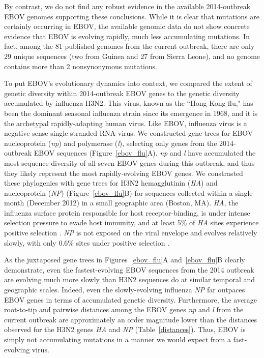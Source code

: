 \documentclass[11pt]{article}
\begin{document}
By contrast, we do not find any robust evidence in the available 2014-outbreak EBOV genomes supporting these conclusions. While it is clear that mutations are certainly occurring in EBOV, the available genomic data do not show concrete evidence that EBOV is evolving rapidly, much less accumulating mutations. In fact, among the 81 published genomes from the current outbreak, there are only 29 unique sequences (two from Guinea and 27 from Sierra Leone), and no genome contains more than 2 nonsynonymous mutations.

To put EBOV's evolutionary dynamics into context, we compared the extent of genetic diversity within 2014-outbreak EBOV genes to the genetic diversity accumulated by influenza H3N2. This virus, known as the ``Hong-Kong flu," has been the dominant seasonal influenza strain since its emergence in 1968, and it is the archetypal rapidly-adapting human virus. Like EBOV, influenza virus is a negative-sense single-stranded RNA virus. We constructed gene trees for EBOV nucleoprotein (\emph{np}) and polymerase (\emph{l}), selecting only genes from the 2014-outbreak EBOV sequences (Figure~\ref{ebov_flu}A). \emph{np} and \emph{l} have accumulated the most sequence diversity of all seven EBOV genes during this outbreak, and thus they likely represent the most rapidly-evolving EBOV genes. We constrasted these phylogenies with gene trees for H3N2 hemagglutinin (\emph{HA}) and nucleoprotein (\emph{NP}) (Figure~\ref{ebov_flu}B) for sequences collected within a single month (December 2012) in a small geographic area (Boston, MA). \emph{HA}, the influenza surface protein responsible for host receptor-binding, is under intense selection pressure to evade host immunity, and at least 5\% of \emph{HA} sites experience positive selection \citep{Bushetal1999,MeyerWilke2013}. \emph{NP} is not exposed on the viral envelope and evolves relatively slowly, with only 0.6\% sites under positive selection \citep{Linetal2011}.

As the juxtaposed gene trees in Figures~\ref{ebov_flu}A and~\ref{ebov_flu}B clearly demonstrate, even the fastest-evolving EBOV sequences from the 2014 outbreak are evolving much more slowly than H3N2 sequences do at similar temporal and geographic scales. Indeed, even the slowly-evolving influenza \emph{NP} far outpaces EBOV genes in terms of accumulated genetic diversity. Furthermore, the average root-to-tip and pairwise distances among the EBOV genes \emph{np} and \emph{l} from the current outbreak are approximately an order magnitude lower than the distances observed for the H3N2 genes \emph{HA} and \emph{NP} (Table~\ref{distances}). Thus, EBOV is simply not accumulating mutations in a manner we would expect from a fast-evolving virus.
\end{document}
